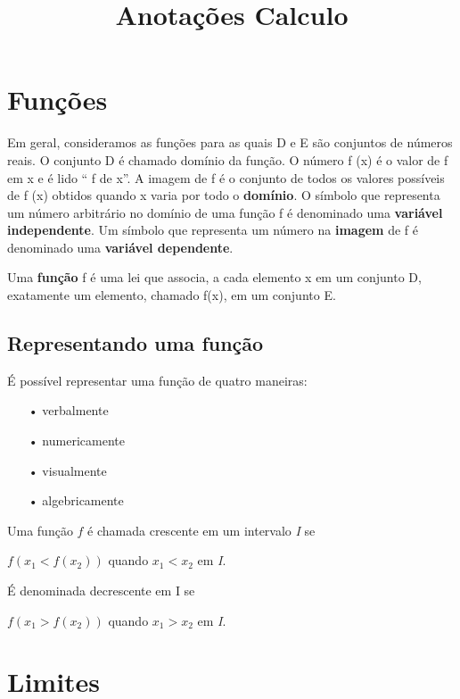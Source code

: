 \documentclass[10pt,a4paper]{article}
\title{Anotações Calculo}
\begin{document}
\maketitle
\tableofcontents
\newpage


\section{Funções}
Em geral, consideramos as funções para as quais D e E são conjuntos de números reais. O conjunto D é chamado domínio da função. O número f (x) é o valor de f em x e é lido “ f de x”. A imagem de f é o conjunto de todos os valores possíveis de f (x) obtidos quando x varia por todo o \textbf{domínio}. O símbolo que representa um número arbitrário no domínio de uma função f é denominado uma \textbf{variável independente}. Um símbolo que representa um número na \textbf{imagem} de f é denominado uma \textbf{variável dependente}.
\begin{df}
	Uma \textbf{função} f é uma lei que associa, a cada elemento x em um conjunto D, exatamente um elemento, chamado f(x), em um conjunto E.
\end{df}
\subsection*{Representando uma função}
\begin{multicols}{2}

\columnbreak
É possível representar uma função de quatro maneiras:
\begin{itemize}
	\item[•]verbalmente
	\item[•]numericamente
	\item[•]visualmente
	\item[•]algebricamente
\end{itemize}
\end{multicols}


\begin{df}
	Uma função $f$ é chamada crescente em um intervalo \textit{I} se
	
	\begin{center}
		$f(x_{1} < f(x_{2}))$ quando $x_{1} < x_{2}$ em \textit{I}.
	\end{center}

	É denominada decrescente em I se

	\begin{center}
		$f(x_{1} > f(x_{2}))$ quando $x_{1} > x_{2}$ em \textit{I}.
	\end{center}
\end{df}

\section{Limites}
\end{document}
